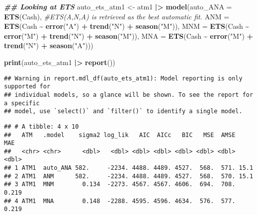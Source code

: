 \documentclass[
]{article}
\newenvironment{Shaded}{\begin{snugshade}}{\end{snugshade}}
\newcommand{\AttributeTok}[1]{\textcolor[rgb]{0.13,0.29,0.53}{#1}}
\newcommand{\CommentTok}[1]{\textcolor[rgb]{0.56,0.35,0.01}{\textit{#1}}}
\newcommand{\DocumentationTok}[1]{\textcolor[rgb]{0.56,0.35,0.01}{\textbf{\textit{#1}}}}
\newcommand{\FunctionTok}[1]{\textcolor[rgb]{0.13,0.29,0.53}{\textbf{#1}}}
\newcommand{\NormalTok}[1]{#1}
\newcommand{\OtherTok}[1]{\textcolor[rgb]{0.56,0.35,0.01}{#1}}
\newcommand{\SpecialCharTok}[1]{\textcolor[rgb]{0.81,0.36,0.00}{\textbf{#1}}}
\newcommand{\StringTok}[1]{\textcolor[rgb]{0.31,0.60,0.02}{#1}}
\begin{document}
\begin{Shaded}
\begin{Highlighting}[]
\DocumentationTok{\#\# Looking at ETS}
\NormalTok{auto\_ets\_atm1 }\OtherTok{\textless{}{-}}\NormalTok{ atm1 }\SpecialCharTok{|\textgreater{}} \FunctionTok{model}\NormalTok{(}\AttributeTok{auto\_ANA =} \FunctionTok{ETS}\NormalTok{(Cash), }\CommentTok{\#ETS(A,N,A) is retrieved as the best automatic fit. }
                               \AttributeTok{ANM =} \FunctionTok{ETS}\NormalTok{(Cash }\SpecialCharTok{\textasciitilde{}} \FunctionTok{error}\NormalTok{(}\StringTok{"A"}\NormalTok{) }\SpecialCharTok{+} \FunctionTok{trend}\NormalTok{(}\StringTok{"N"}\NormalTok{) }\SpecialCharTok{+} \FunctionTok{season}\NormalTok{(}\StringTok{"M"}\NormalTok{)),}
                               \AttributeTok{MNM =} \FunctionTok{ETS}\NormalTok{(Cash }\SpecialCharTok{\textasciitilde{}} \FunctionTok{error}\NormalTok{(}\StringTok{"M"}\NormalTok{) }\SpecialCharTok{+} \FunctionTok{trend}\NormalTok{(}\StringTok{"N"}\NormalTok{) }\SpecialCharTok{+} \FunctionTok{season}\NormalTok{(}\StringTok{"M"}\NormalTok{)),}
                               \AttributeTok{MNA =} \FunctionTok{ETS}\NormalTok{(Cash }\SpecialCharTok{\textasciitilde{}} \FunctionTok{error}\NormalTok{(}\StringTok{"M"}\NormalTok{) }\SpecialCharTok{+} \FunctionTok{trend}\NormalTok{(}\StringTok{"N"}\NormalTok{) }\SpecialCharTok{+} \FunctionTok{season}\NormalTok{(}\StringTok{"A"}\NormalTok{)))}


\FunctionTok{print}\NormalTok{(auto\_ets\_atm1 }\SpecialCharTok{|\textgreater{}} \FunctionTok{report}\NormalTok{())}
\end{Highlighting}
\end{Shaded}

\begin{verbatim}
## Warning in report.mdl_df(auto_ets_atm1): Model reporting is only supported for
## individual models, so a glance will be shown. To see the report for a specific
## model, use `select()` and `filter()` to identify a single model.
\end{verbatim}

\begin{verbatim}
## # A tibble: 4 x 10
##   ATM   .model    sigma2 log_lik   AIC  AICc   BIC   MSE  AMSE    MAE
##   <chr> <chr>      <dbl>   <dbl> <dbl> <dbl> <dbl> <dbl> <dbl>  <dbl>
## 1 ATM1  auto_ANA 582.     -2234. 4488. 4489. 4527.  568.  571. 15.1  
## 2 ATM1  ANM      582.     -2234. 4488. 4489. 4527.  568.  570. 15.1  
## 3 ATM1  MNM        0.134  -2273. 4567. 4567. 4606.  694.  708.  0.219
## 4 ATM1  MNA        0.148  -2288. 4595. 4596. 4634.  576.  577.  0.219
\end{verbatim}
\end{document}
